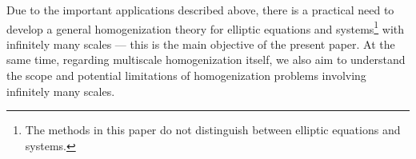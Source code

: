 \documentclass[reqno,12pt]{amsart} %
\theoremstyle{definition}
\theoremstyle{remark}
\numberwithin{equation}{section}
\begin{document}







Due to the important applications described above, there is a practical need to develop a general homogenization theory for elliptic equations and systems\footnote{The methods in this paper do not distinguish between elliptic equations and systems.} with infinitely many scales --- this is the main objective of the present paper. At the same time, regarding multiscale homogenization itself, we also aim to understand the scope and potential limitations of homogenization problems involving infinitely many scales.
\end{document}
